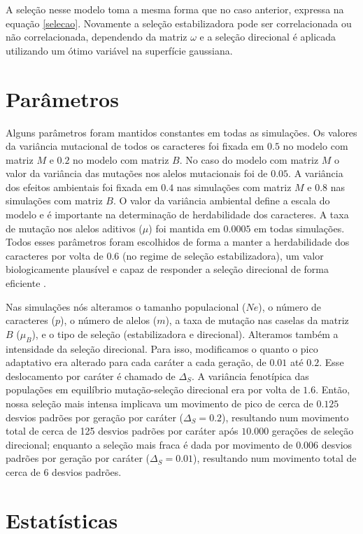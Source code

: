 A seleção nesse modelo toma a mesma forma que no caso anterior, expressa
na equação \ref{selecao}.
Novamente a seleção estabilizadora pode ser correlacionada ou não
correlacionada, dependendo da matriz $\omega$ e a seleção direcional é
aplicada utilizando um ótimo variável na superfície gaussiana.

\section{Parâmetros}

Alguns parâmetros foram mantidos constantes em todas as simulações.  Os
valores da variância mutacional de todos os caracteres foi fixada em
$0.5$ no modelo com matriz $M$ e $0.2$ no modelo com matriz $B$.
No caso do modelo com matriz $M$ o valor da variância das mutações nos
alelos mutacionais foi de $0.05$.
A variância dos efeitos ambientais foi fixada em $0.4$ nas simulações com
matriz $M$ e $0.8$ nas simulações com matriz $B$.
O valor da variância ambiental define a escala do modelo e é importante
na determinação de herdabilidade dos caracteres.
A taxa de mutação nos alelos aditivos ($\mu$) foi mantida em $0.0005$ em
todas simulações.
Todos esses parâmetros foram escolhidos de forma a manter a
herdabilidade dos caracteres por volta de $0.6$ (no regime de seleção
estabilizadora), um valor biologicamente
plausível e capaz de responder a seleção direcional de forma eficiente
\citep{Cheverud1988}.

Nas simulações nós alteramos o tamanho populacional ($Ne$), o número de
caracteres ($p$), o número de alelos ($m$), a taxa de mutação nas caselas da
matriz $B$ ($\mu_B$), e o tipo de seleção (estabilizadora e direcional).
Alteramos também a intensidade da seleção direcional.
Para isso, modificamos o quanto o pico adaptativo era alterado para cada
caráter a cada geração, de $0.01$ até $0.2$.
Esse deslocamento por caráter é chamado de $\Delta_S$.
A variância fenotípica das populações em equilíbrio mutação-seleção
direcional era por volta de $1.6$.
Então, nossa seleção mais intensa implicava um movimento de pico de
cerca de $0.125$ desvios padrões por geração por caráter ($\Delta_S=0.2$),
resultando num movimento total de cerca de 125 desvios padrões por caráter
após $10.000$ gerações de seleção direcional; enquanto a seleção mais
fraca é dada por movimento de $0.006$ desvios padrões por geração por caráter
($\Delta_S=0.01$), resultando num movimento total de cerca de 6 desvios
padrões.

\section{Estatísticas}

